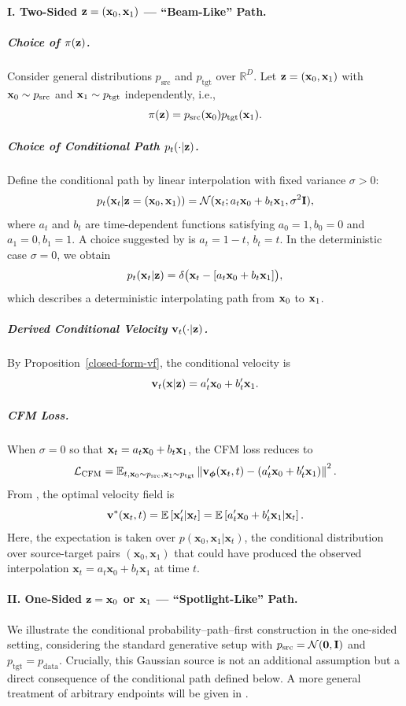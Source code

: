\paragraph{I. Two-Sided ${\mathbf{z}} = ({\mathbf{x}}_0, {\mathbf{x}}_1)$ — ``Beam-Like'' Path.}
    \subparagraph{Choice of $\pi({\mathbf{z}})$.} Consider general distributions $p_{\mathrm{src}}$ and $p_{\mathrm{tgt}}$ over $\mathbb{R}^D$. Let ${\mathbf{z}} = ({\mathbf{x}}_0, {\mathbf{x}}_1)$ with ${\mathbf{x}}_0 \sim p_{\mathrm{src}}$ and ${\mathbf{x}}_1 \sim p_{\mathrm{tgt}}$ independently, i.e.,
    \[
    \pi({\mathbf{z}}) = p_{\mathrm{src}}({\mathbf{x}}_0)  p_{\mathrm{tgt}}({\mathbf{x}}_1).
    \]
    \subparagraph{Choice of Conditional Path $p_t(\cdot|{\mathbf{z}})$.} Define the conditional path by linear interpolation with fixed variance $\sigma > 0$:
    \[
    p_t({\mathbf{x}}_t | {\mathbf{z}} = ({\mathbf{x}}_0, {\mathbf{x}}_1)) = \mathcal{N}({\mathbf{x}}_t; a_t{\mathbf{x}}_0 + b_t{\mathbf{x}}_1,  \sigma^2 {\mathbf{I}}),
    \]
    where $a_t$ and $b_t$ are time-dependent functions satisfying  $a_0 = 1,  b_0 = 0$ and $a_1 = 0,  b_1 = 1$. A choice suggested by \citep{lipman2022flow,liu2022rectified} is $a_t = 1-t$, $b_t = t$.  In the deterministic case $\sigma = 0$, we obtain  
\[
p_t({\mathbf{x}}_t |{\mathbf{z}}) = \delta \big({\mathbf{x}}_t - [a_t{\mathbf{x}}_0 + b_t{\mathbf{x}}_1]\big),
\]
which describes a deterministic interpolating path from ${\mathbf{x}}_0$ to ${\mathbf{x}}_1$.
    \subparagraph{Derived Conditional Velocity  ${\mathbf{v}}_t(\cdot|{\mathbf{z}})$.} By Proposition~\ref{closed-form-vf}, the conditional velocity is
    \[
    {\mathbf{v}}_t({\mathbf{x}} | {\mathbf{z}}) = a'_t{\mathbf{x}}_0 + b'_t{\mathbf{x}}_1.
    \]
    \subparagraph{CFM Loss.} When $\sigma=0$ so that ${\mathbf{x}}_t = a_t{\mathbf{x}}_0 + b_t{\mathbf{x}}_1$, the CFM loss reduces to
    \[
    \mathcal{L}_{\mathrm{CFM}} = \mathbb{E}_{t, {\mathbf{x}}_0\sim p_{\text{src}}, {\mathbf{x}}_1\sim p_{\text{tgt}}} \left\| {\mathbf{v}}_{\bm{\phi}}({\mathbf{x}}_t, t) - \left(a'_t{\mathbf{x}}_0 + b'_t{\mathbf{x}}_1\right) \right\|^2.
    \]
From , the optimal velocity field is
\[
{\mathbf{v}}^*({\mathbf{x}}_t, t) = \mathbb{E} \left[ {\mathbf{x}}_t'|{\mathbf{x}}_t \right] = \mathbb{E} \left[ a'_t{\mathbf{x}}_0 + b'_t{\mathbf{x}}_1|{\mathbf{x}}_t \right].
\]
Here, the expectation is taken over $p(\mathbf{x}_0, \mathbf{x}_1|\mathbf{x}_t)$, the conditional distribution over source-target pairs $(\mathbf{x}_0, \mathbf{x}_1)$ that could have produced the observed interpolation $\mathbf{x}_t = a_t\mathbf{x}_0 + b_t\mathbf{x}_1$ at time $t$.



\paragraph{II. One-Sided ${\mathbf{z}} = {\mathbf{x}}_0$ or ${\mathbf{x}}_1$ — ``Spotlight-Like'' Path.}
We illustrate the conditional probability–path–first construction in the one-sided setting, considering the standard generative setup with $p_{\mathrm{src}}=\mathcal N(\bm 0,{\mathbf{I}})$ and $p_{\mathrm{tgt}}=p_{\mathrm{data}}$.
Crucially, this Gaussian source is not an additional assumption but a direct consequence of the conditional path defined below.
A more general treatment of arbitrary endpoints will be given in .

